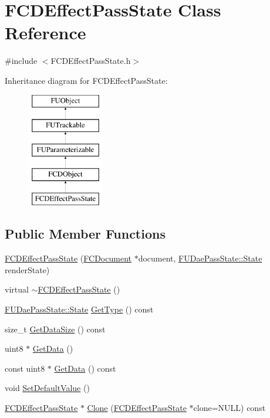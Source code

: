 \hypertarget{classFCDEffectPassState}{
\section{FCDEffectPassState Class Reference}
\label{classFCDEffectPassState}
}


{\ttfamily \#include $<$FCDEffectPassState.h$>$}

Inheritance diagram for FCDEffectPassState:\begin{figure}[H]
\begin{center}
\leavevmode
\includegraphics[height=5.000000cm]{classFCDEffectPassState}
\end{center}
\end{figure}
\subsection*{Public Member Functions}
\begin{DoxyCompactItemize}
\item 
\hyperlink{classFCDEffectPassState_abbc4d010d4024ce229baca1894099e9f}{FCDEffectPassState} (\hyperlink{classFCDocument}{FCDocument} $\ast$document, \hyperlink{namespaceFUDaePassState_a99a648050f80bc29359e932cffa8c973}{FUDaePassState::State} renderState)
\item 
virtual \hyperlink{classFCDEffectPassState_ab765430051f401516ee57b9aefe5dec7}{$\sim$FCDEffectPassState} ()
\item 
\hyperlink{namespaceFUDaePassState_a99a648050f80bc29359e932cffa8c973}{FUDaePassState::State} \hyperlink{classFCDEffectPassState_ada8069dff94f685d4b8c65ffde91704c}{GetType} () const 
\item 
size\_\-t \hyperlink{classFCDEffectPassState_ac7f6bda16f381c3dd55dd103816f458a}{GetDataSize} () const 
\item 
uint8 $\ast$ \hyperlink{classFCDEffectPassState_a23eb14cd11c0c65586e564199939ccf9}{GetData} ()
\item 
const uint8 $\ast$ \hyperlink{classFCDEffectPassState_ad0394f4c508bf9058a3208b592e06954}{GetData} () const 
\item 
void \hyperlink{classFCDEffectPassState_aaa372d3b7ee42af4c54eff6240fd9f5c}{SetDefaultValue} ()
\item 
\hyperlink{classFCDEffectPassState}{FCDEffectPassState} $\ast$ \hyperlink{classFCDEffectPassState_a7b41150adfb37a3ad71d5d3d9d3bd02f}{Clone} (\hyperlink{classFCDEffectPassState}{FCDEffectPassState} $\ast$clone=NULL) const 
\end{DoxyCompactItemize}



